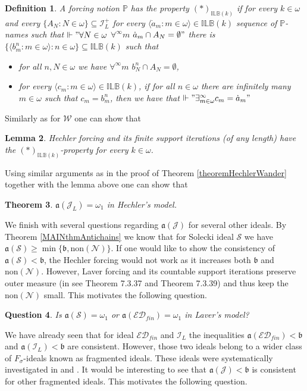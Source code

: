 \documentclass[a4paper]{amsart}
\newtheorem{theorem}{Theorem}[section]
\newtheorem{lemma}[theorem]{Lemma}
\newtheorem{question}[theorem]{Question}
\newtheorem{definition}[theorem]{Definition}
\newcommand{\aaa}{\mathfrak{a}}
\newcommand{\bbb}{\mathfrak{b}}
\newcommand{\Null}{\mathcal{N}}
\newcommand{\non}{\mathrm{non}}
\newcommand{\J}{\mathcal{J}}
\newcommand{\Solecki}{\mathcal{S}}
\newcommand{\ED}{\mathcal{ED}}
\newcommand{\WANDER}{\mathcal{W}}
\newcommand{\ILB}{\mathbb{ILB}}
\begin{document}
\begin{definition}
    A forcing notion $\mathbb{P}$ has the property $(*)_{\ILB(k)}$ if for every $k\in\omega$ and every $\{A_{N}:N\in\omega\}\subseteq\mathcal{I}_{L}^{+}$ for every $ \langle\dot{a}_{m}:m\in\omega\rangle\in \ILB(k)$ sequence of $\mathbb{P}$-names such that $\Vdash"\forall N\in\omega$ $\forall^{\infty}m$ $\dot{a}_{m}\cap A_{N}=\emptyset"$ there is $\{\langle b^{n}_{m}:m\in\omega\rangle:n\in\omega\}\subseteq\ILB(k)$ such that
    \begin{itemize}
        \item[1)] for all $n,N\in\omega$ we have $\forall^{\infty}m$ $b^{n}_{N}\cap A_{N}=\emptyset$, 
        \item[2)] for every $\langle c_{m}:m\in\omega\rangle\in\ILB(k)$, if for all $n\in\omega$ there are infinitely many $m\in\omega$ such that $c_{m}=b^{n}_{m}$, then we have that $\Vdash"\exists^{\infty}_{m\in\omega} c_{m}=\dot{a}_{m}"$ 
    \end{itemize}
\end{definition}
Similarly as for $\WANDER$ one can show that 
\begin{lemma}
    Hechler forcing and its finite support iterations (of any length) have the $(*)_{\ILB(k)}$-property for every $k\in\omega$.
\end{lemma}
Using similar arguments as in the proof of Theorem \ref{theoremHechlerWander} together with the lemma above one can show that
\begin{theorem}
    $\aaa(\mathcal{J}_{L})=\omega_{1}$ in Hechler's model.
\end{theorem}
We finish with several questions regarding $\aaa(\J)$ for several other ideals. By Theorem \ref{MAINthmAntichains} we know that for Solecki ideal $\Solecki$ we have $\aaa(\Solecki)\geq\min\{\bbb,\non(\Null)\}$. If one would like to show the consistency of $\aaa(\Solecki)<\bbb$, the Hechler forcing would not work as it increases both $\bbb$ and $\non(\Null)$. However, Laver forcing and its countable support iterations preserve outer measure (in \cite{BJ} see Theorem 7.3.37 and Theorem 7.3.39) and thus keep the $\non(\Null)$ small. This motivates the following question.
\begin{question}
    Is $\aaa(\Solecki)=\omega_{1}$ or $\aaa(\ED_{fin})=\omega_{1}$ in Laver's model?
\end{question}
We have already seen that for ideal $\ED_{fin}$ and $\mathcal{I}_{L}$ the inequalities $\aaa(\ED_{fin})<\bbb$ and $\aaa(\mathcal{I}_{L})<\bbb$ are consistent. However, those two ideals belong to a wider class of $F_{\sigma}$-ideals known as fragmented ideals. These ideals were systematically investigated in \cite{HruZapletalRojas} and \cite{BrendleDiego}. It would be interesting to see that $\aaa(\J)<\bbb$ is consistent for other fragmented ideals. This motivates the following question.
\end{document}
